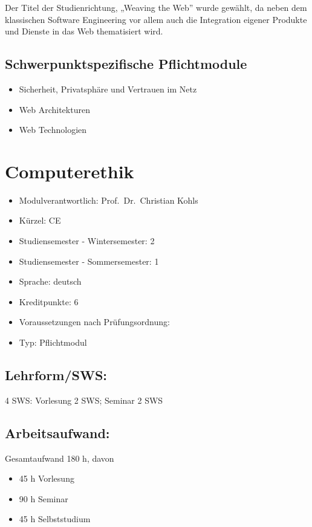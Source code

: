 Der Titel der Studienrichtung, „Weaving the Web'' wurde gewählt, da
neben dem klassischen Software Engineering vor allem auch die
Integration eigener Produkte und Dienste in das Web thematisiert wird.

\section*{Schwerpunktspezifische
Pflichtmodule}\label{schwerpunktspezifische-pflichtmodule-4}

\begin{itemize}
\item
  Sicherheit, Privatsphäre und Vertrauen im Netz
\item
  Web Architekturen
\item
  Web Technologien
\end{itemize}

\chapter{Computerethik}\label{computerethik}

\begin{itemize}
\tightlist
\item
  Modulverantwortlich: Prof.~Dr.~Christian Kohls
\item
  Kürzel: CE
\item
  Studiensemester - Wintersemester: 2
\item
  Studiensemester - Sommersemester: 1
\item
  Sprache: deutsch
\item
  Kreditpunkte: 6
\item
  Voraussetzungen nach Prüfungsordnung:
\item
  Typ: Pflichtmodul
\end{itemize}

\section*{Lehrform/SWS:}\label{lehrformsws}

4 SWS: Vorlesung 2 SWS; Seminar 2 SWS

\section*{Arbeitsaufwand:}\label{arbeitsaufwand}

Gesamtaufwand 180 h, davon

\begin{itemize}
\item
  45 h Vorlesung
\item
  90 h Seminar
\item
  45 h Selbststudium
\end{itemize}

